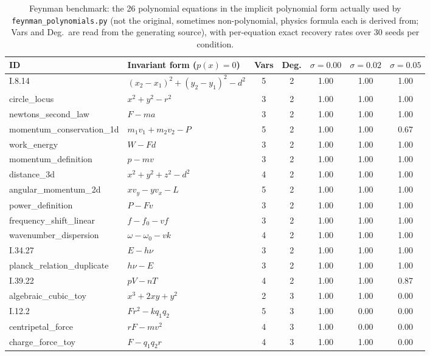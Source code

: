 \documentclass{article}
\begin{document}
\begin{table}[ht]
\centering
\caption{Feynman benchmark: the 26 polynomial equations in the implicit
polynomial form actually used by \texttt{feynman\_polynomials.py} (not
the original, sometimes non-polynomial, physics formula each is derived
from; Vars and Deg.\ are read from the generating source), with
per-equation exact recovery rates over 30 seeds per condition.}
\label{tab:feynman-full}
\label{tab:feynman-per-eq}
\small
\begin{tabular}{llccccc}
\toprule
\textbf{ID} & \textbf{Invariant form ($p(x)=0$)} & \textbf{Vars} &
  \textbf{Deg.} & $\sigma=0.00$ & $\sigma=0.02$ & $\sigma=0.05$\\
\midrule
I.8.14 & $(x_2-x_1)^2+(y_2-y_1)^2-d^2$ & 5 & 2 & 1.00 & 1.00 & 1.00\\
circle_locus & $x^2+y^2-r^2$ & 3 & 2 & 1.00 & 1.00 & 1.00\\
newtons_second_law & $F-ma$ & 3 & 2 & 1.00 & 1.00 & 1.00\\
momentum_conservation_1d & $m_1v_1+m_2v_2-P$ & 5 & 2 & 1.00 & 1.00 & 0.67\\
work_energy & $W-Fd$ & 3 & 2 & 1.00 & 1.00 & 1.00\\
momentum_definition & $p-mv$ & 3 & 2 & 1.00 & 1.00 & 1.00\\
distance_3d & $x^2+y^2+z^2-d^2$ & 4 & 2 & 1.00 & 1.00 & 1.00\\
angular_momentum_2d & $xv_y-yv_x-L$ & 5 & 2 & 1.00 & 1.00 & 1.00\\
power_definition & $P-Fv$ & 3 & 2 & 1.00 & 1.00 & 1.00\\
frequency_shift_linear & $f-f_0-vf$ & 3 & 2 & 1.00 & 1.00 & 1.00\\
wavenumber_dispersion & $\omega-\omega_0-vk$ & 4 & 2 & 1.00 & 1.00 & 1.00\\
I.34.27 & $E-h\nu$ & 3 & 2 & 1.00 & 1.00 & 1.00\\
planck_relation_duplicate & $h\nu-E$ & 3 & 2 & 1.00 & 1.00 & 1.00\\
I.39.22 & $pV-nT$ & 4 & 2 & 1.00 & 1.00 & 0.87\\
\addlinespace
algebraic_cubic_toy & $x^3+2xy+y^2$ & 2 & 3 & 1.00 & 1.00 & 0.00\\
I.12.2 & $Fr^2-kq_1q_2$ & 5 & 3 & 1.00 & 0.00 & 0.00\\
centripetal_force & $rF-mv^2$ & 4 & 3 & 1.00 & 0.00 & 0.00\\
charge_force_toy & $F-q_1q_2r$ & 4 & 3 & 1.00 & 1.00 & 0.00\\

\end{tabular}
\end{table}
\end{document}
